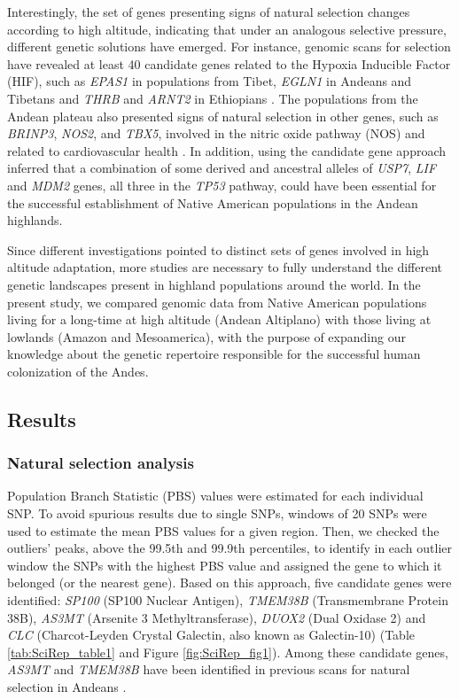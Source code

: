 Interestingly, the set of genes presenting signs of natural selection changes according to high altitude, indicating that under an analogous selective pressure, different genetic solutions have emerged. For instance, genomic scans for selection have revealed at least 40 candidate genes related to the Hypoxia Inducible Factor (HIF), such as \textsl{EPAS1} in populations from Tibet, \textsl{EGLN1} in Andeans and Tibetans and \textsl{THRB} and \textsl{ARNT2} in Ethiopians \cite{beall_natural_2010,bigham_identifying_2010,simonson_genetic_2010,peng_genetic_2011,xu_genome-wide_2011,scheinfeldt_genetic_2012}. The populations from the Andean plateau also presented signs of natural selection in other genes, such as \textsl{BRINP3}, \textsl{NOS2}, and \textsl{TBX5}, involved in the nitric oxide pathway (NOS) and related to cardiovascular health \cite{fehren-schmitz_ancient_2016}. In addition,  using the candidate gene approach inferred that a combination of some derived and ancestral alleles of \textsl{USP7}, \textsl{LIF} and \textsl{MDM2} genes, all three in the \textsl{TP53} pathway, could have been essential for the successful establishment of Native American populations in the Andean highlands.

Since different investigations pointed to distinct sets of genes involved in high altitude adaptation, more studies are necessary to fully understand the different genetic landscapes present in highland populations around the world. In the present study, we compared genomic data from Native American populations living for a long-time at high altitude (Andean Altiplano) with those living at lowlands (Amazon and Mesoamerica), with the purpose of expanding our knowledge about the genetic repertoire responsible for the successful human colonization of the Andes.

\subsection{Results}

\subsubsection{Natural selection analysis}

Population Branch Statistic (PBS) values were estimated for each individual SNP. To avoid spurious results due to single SNPs, windows of 20 SNPs were used to estimate the mean PBS values for a given region. Then, we checked the outliers’ peaks, above the 99.5th and 99.9th percentiles, to identify in each outlier window the SNPs with the highest PBS value and assigned the gene to which it belonged (or the nearest gene). Based on this approach, five candidate genes were identified: \textsl{SP100} (SP100 Nuclear Antigen), \textsl{TMEM38B} (Transmembrane Protein 38B), \textsl{AS3MT} (Arsenite 3 Methyltransferase), \textsl{DUOX2} (Dual Oxidase 2) and \textsl{CLC} (Charcot-Leyden Crystal Galectin, also known as Galectin-10) (Table \ref{tab:SciRep_table1} and Figure \ref{fig:SciRep_fig1}). Among these candidate genes, \textsl{AS3MT} and \textsl{TMEM38B} have been identified in previous scans for natural selection in Andeans \cite{eichstaedt_positive_2015,crawford_natural_2017}.

